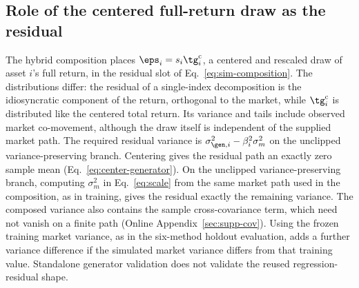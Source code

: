 \subsection{Role of the centered full-return draw as the residual}
\label{sec:supp-residual-choice}

The hybrid composition places $\eps_i = s_i \tg_i^{\mathrm c}$, a
centered and rescaled draw of asset $i$'s full return, in the residual
slot of Eq.~\eqref{eq:sim-composition}. The distributions differ: the residual of a single-index decomposition is the
idiosyncratic component of the return, orthogonal to the market, while
$\tg_i^{\mathrm c}$ is distributed like the centered total return. Its variance and tails include observed market co-movement, although
the draw itself is independent of the supplied market path.
The required residual variance is $\sigma_{\gen,i}^2 - \beta_i^2 \sigma_m^2$ on the unclipped variance-preserving branch. Centering
gives the residual path an exactly zero sample mean
(Eq.~\eqref{eq:center-generator}). On the unclipped variance-preserving
branch, computing $\sigma_m^2$ in Eq.~\eqref{eq:scale} from the same
market path used in the composition, as in training, gives the
residual exactly the remaining variance. The composed variance also
contains the sample cross-covariance term, which need not vanish on a
finite path (Online Appendix~\ref{sec:supp-cov}). Using the frozen
training market variance, as in the six-method holdout evaluation,
adds a further variance difference if the simulated market variance
differs from that training value. Standalone generator validation does not validate the reused regression-residual shape.

